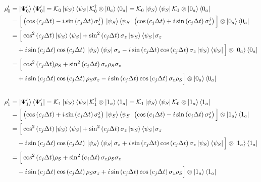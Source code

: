 \documentclass[a4paper,12pt]{article}
\begin{document}
	\begin{align}
		\rho'_{0} &= \ket{\Psi'_{0}}\bra{\Psi'_{0}} = \mathcal{K}_{0} \ket{\psi_S}\bra{\psi_S} \mathcal{K}_{0}^{\dagger} \otimes \ket{0_a}\bra{0_a} = \mathcal{K}_{0} \ket{\psi_S}\bra{\psi_S} \mathcal{K}_{1} \otimes \ket{0_a}\bra{0_a} \notag \\ 
		& = \Big [ \left(\cos{\left( c_j \Delta t \right)} - i \sin{\left( c_j \Delta t \right)} \, \sigma_{z}^{j}\right) \, \ket{\psi_S}\bra{\psi_S} \, \left(\cos{\left( c_j \Delta t \right)} + i \sin{\left( c_j \Delta t \right)} \, \sigma_{z}^{j}\right) \Big]    \otimes \ket{0_a}\bra{0_a} \notag \\
		&= \Big [ \cos^{2}{\left(c_{j} \Delta t\right)} \ket{\psi_S}\bra{\psi_S} + \sin^{2}{\left(c_{j} \Delta t\right)} \, \sigma_{z} \ket{\psi_S}\bra{\psi_S} \sigma_{z} \notag  \\
		& \quad + i \sin{\left(c_{j} \Delta t \right)} \cos{\left(c_{j} \Delta t\right)} \,  \ket{\psi_S}\bra{\psi_S} \sigma_{z} -i \sin{\left(c_{j} \Delta t \right)} \cos{\left(c_{j} \Delta t\right)} \, \sigma_{z} \ket{\psi_S}\bra{\psi_S} \Big] \otimes \ket{0_a}\bra{0_a} \notag \\
		&= \Big [ \cos^{2}{\left(c_{j} \Delta t\right)} \rho_S + \sin^{2}{\left(c_{j} \Delta t\right)} \, \sigma_{z} \rho_S \sigma_{z} \notag \\
		& \quad + i \sin{\left(c_{j} \Delta t \right)} \cos{\left(c_{j} \Delta t\right)} \, \rho_S \sigma_{z} - i \sin{\left(c_{j} \Delta t \right)} \cos{\left(c_{j} \Delta t\right)} \, \sigma_{z} \rho_S \Big] \otimes \ket{0_a}\bra{0_a} \\
		\notag \\
		\rho'_{1} &= \ket{\Psi'_{1}}\bra{\Psi'_{1}} = \mathcal{K}_{1} \ket{\psi_S}\bra{\psi_S} \mathcal{K}_{1}^{\dagger} \otimes \ket{1_a}\bra{1_a} = \mathcal{K}_{1} \ket{\psi_S}\bra{\psi_S} \mathcal{K}_{0} \otimes \ket{1_a}\bra{1_a} \notag \\ 
		& = \Big [ \left(\cos{\left( c_j \Delta t \right)} + i \sin{\left( c_j \Delta t \right)} \, \sigma_{z}^{j}\right) \, \ket{\psi_S}\bra{\psi_S} \, \left(\cos{\left( c_j \Delta t \right)} - i \sin{\left( c_j \Delta t \right)} \, \sigma_{z}^{j}\right) \Big]    \otimes \ket{1_a}\bra{1_a} \notag \\
		&= \Big [ \cos^{2}{\left(c_{j} \Delta t\right)} \ket{\psi_S}\bra{\psi_S} + \sin^{2}{\left(c_{j} \Delta t\right)} \, \sigma_{z} \ket{\psi_S}\bra{\psi_S} \sigma_{z} \notag \\
		& \quad - i \sin{\left(c_{j} \Delta t \right)} \cos{\left(c_{j} \Delta t\right)} \,  \ket{\psi_S}\bra{\psi_S} \sigma_{z} + i \sin{\left(c_{j} \Delta t \right)} \cos{\left(c_{j} \Delta t\right)} \, \sigma_{z} \ket{\psi_S}\bra{\psi_S}  \Big] \otimes \ket{1_a}\bra{1_a} \notag \\
		&= \Big [ \cos^{2}{\left(c_{j} \Delta t\right)} \rho_S + \sin^{2}{\left(c_{j} \Delta t\right)} \, \sigma_{z} \rho_S \sigma_{z} \notag \\
		& \quad - i \sin{\left(c_{j} \Delta t \right)} \cos{\left(c_{j} \Delta t\right)} \, \rho_S \sigma_{z} + i \sin{\left(c_{j} \Delta t \right)} \cos{\left(c_{j} \Delta t\right)} \, \sigma_{z} \rho_S \Big] \otimes \ket{1_a}\bra{1_a}
	\end{align}
	
\end{document}
